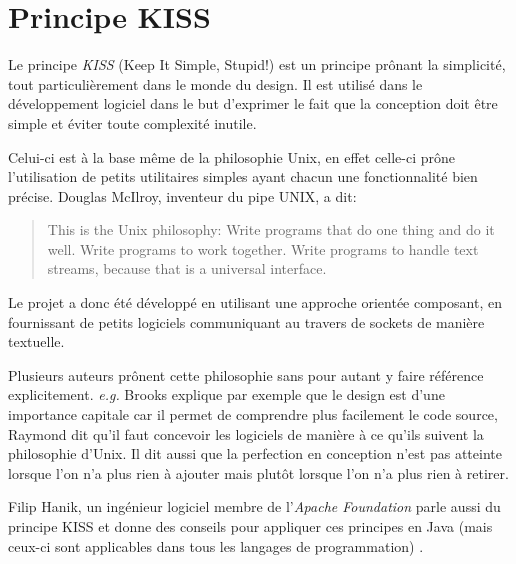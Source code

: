 \chapter{Principe KISS}\label{ann:kiss}
\renewcommand{\leftmark}{ANNEXE \thechapter.~~Principe KISS}
\label{annexe2}
Le principe \emph{KISS} (Keep It Simple, Stupid!) \cite{wiki:kiss} est un
principe prônant la simplicité, tout particulièrement dans le monde du design.
Il est utilisé dans le développement logiciel dans le but d'exprimer le fait
que la conception doit être simple et éviter toute complexité inutile.

Celui-ci est à la base même de la philosophie Unix, en effet celle-ci prône
l'utilisation de petits utilitaires simples ayant chacun une fonctionnalité
bien précise.
Douglas McIlroy, inventeur du pipe UNIX, a dit\cite{quartercentury-unix}:
\begin{quote}
  This is the Unix philosophy: Write programs that do one thing and do
  it well. Write programs to work together. Write programs to handle
  text streams, because that is a universal interface.
\end{quote}
Le projet a donc été développé en utilisant une approche orientée
composant\cite{wiki:poc}, en fournissant de petits
logiciels communiquant au travers de sockets de manière textuelle.

Plusieurs auteurs
\cite{Brooks1995, Raymond2001} prônent cette philosophie sans pour autant
y faire référence explicitement. \emph{e.g.} Brooks explique par exemple
que le design est d'une importance capitale car il permet de comprendre
plus facilement le code source, Raymond dit qu'il faut concevoir les logiciels
de manière à ce qu'ils suivent la philosophie d'Unix. Il dit aussi que
la perfection en conception n'est pas atteinte lorsque l'on n'a plus rien à
ajouter mais plutôt lorsque l'on n'a plus rien à retirer.

Filip Hanik, un ingénieur logiciel membre de l'\emph{Apache Foundation} parle
aussi du principe KISS et donne des conseils pour appliquer ces principes en
Java (mais ceux-ci sont applicables dans tous les langages de programmation)
\cite{fhanikKISS}.

